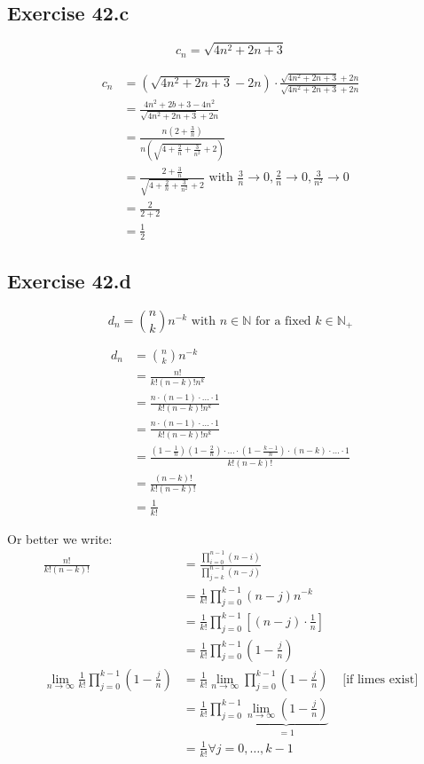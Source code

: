 \documentclass[a4paper]{article}
\theoremstyle{definition}
\begin{document}
\subsection{Exercise 42.c}
\[ c_n = \sqrt{4n^2+2n+3} \]

\begin{align*}
  c_n &= \left(\sqrt{4n^2+2n+3} - 2n\right) \cdot \frac{\sqrt{4n^2 + 2n + 3} + 2n}{\sqrt{4n^2 + 2n + 3} + 2n} \\
      &= \frac{4n^2 + 2b + 3 - 4n^2}{\sqrt{4n^2 + 2n + 3} + 2n} \\
      &= \frac{n \left(2 + \frac3n\right)}{n \left(\sqrt{4 + \frac2n + \frac3{n^2}} + 2\right)} \\
      &= \frac{2 + \frac3n}{\sqrt{4 + \frac2n + \frac3{n^2}} + 2} \text{ with } \frac3n \to 0, \frac2n \to 0, \frac3{n^2} \to 0 \\
      &= \frac2{2 + 2} \\
      &= \frac12
\end{align*}

\subsection{Exercise 42.d}
\[ d_n = \binom{n}{k} n^{-k} \text{ with } n \in \mathbb N \text{ for a fixed } k \in \mathbb N_+ \]

\begin{align*}
  d_n &= \binom{n}{k} n^{-k} \\
      &= \frac{n!}{k! (n-k)! n^k} \\
      &= \frac{n \cdot (n-1) \cdot \dots \cdot 1}{k! (n-k)! n^k} \\
      &= \frac{n \cdot (n-1) \cdot \ldots \cdot 1}{k! (n-k)! n^k} \\
      &= \frac{(1 - \frac1n)(1 - \frac2n) \cdot \ldots \cdot (1 - \frac{k-1}{n}) \cdot (n-k) \cdot \ldots \cdot 1}{k! (n-k)!} \\
      &= \frac{(n-k)!}{k! (n-k)!} \\
      &= \frac{1}{k!}
\end{align*}

Or better we write:
\begin{align*}
  \frac{n!}{k! (n-k)!}
    &= \frac{\prod_{i=0}^{n-1} (n-i)}{\prod_{j=k}^{n-1} (n-j)} \\
    &= \frac{1}{k!} \prod_{j=0}^{k-1} (n-j) n^{-k} \\
    &= \frac{1}{k!} \prod_{j=0}^{k-1} \left[(n-j) \cdot \frac1n\right] \\
    &= \frac1{k!} \prod_{j=0}^{k-1} \left(1 - \frac{j}{n}\right) \\
  \lim_{n\to\infty} \frac1{k!} \prod_{j=0}^{k-1} \left(1 - \frac{j}{n}\right)
    &= \frac1{k!} \lim_{n\to\infty} \prod_{j=0}^{k-1} \left(1 - \frac{j}n\right) & \text{ [if limes exist]} \\
    &= \frac1{k!} \prod_{j=0}^{k-1} \underbrace{\lim_{n\to\infty} \left(1 - \frac{j}{n}\right)}_{=1} \\
    &= \frac1{k!} \forall j = 0, \dots, k-1
\end{align*}
\end{document}

